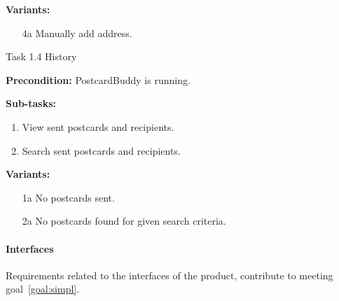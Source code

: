 \documentclass[10pt,a4paper]{article}
\begin{document}
\begin {description}
\begin {description}
\item \textbf{Variants:}
\begin{itemize}[label={}]

\item[4a] Manually add address.
\end{itemize}
\end{description}


\item [Task 1.4] History

\begin {description}
\item \textbf{Precondition:} PostcardBuddy is running. 

\item \textbf{Sub-tasks:}
\begin{enumerate}
\item View sent postcards and recipients. 
\item Search sent postcards and recipients.

\end{enumerate}
\item \textbf{Variants:}
\begin{itemize}[label={}]

\item[1a] No postcards sent. 
\item[2a] No postcards found for given search criteria. 

\end{itemize}
\end{description}
\end{description}



\paragraph{Interfaces}
Requirements related to the interfaces of the product, contribute to meeting goal~\ref{goal:simpl}.
\end{document}
